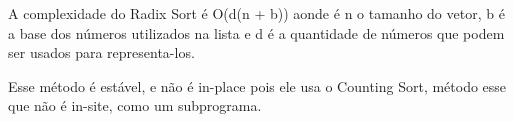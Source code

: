 \documentclass{article}
\begin{document}
	A complexidade do Radix Sort é O(d(n + b)) aonde é n o tamanho do vetor, b é a base dos números utilizados na lista e d é a quantidade de números que podem ser usados para representa-los.
	
	
	Esse método é estável, e não é in-place pois ele usa o Counting Sort, método esse que não é in-site, como um subprograma.\\
	
	
\end{document}
